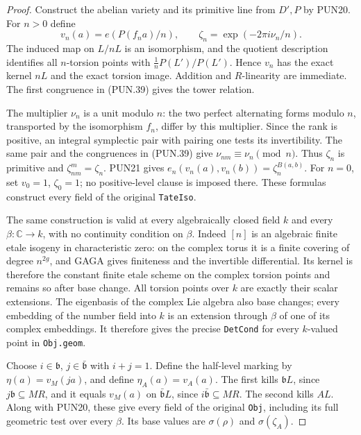 \documentclass[11pt,a4paper]{article}
\numberwithin{equation}{section}
\theoremstyle{remark}\newtheorem{remark}[theorem]{Remark}
\begin{document}
\begin{proof}
Construct the abelian variety and its primitive line from
\(D',P\) by PUN20.  For \(n>0\) define
\[
 v_n(a)=e(P(f_na)/n),\qquad
                         \zeta_n=\exp(-2\pi i\nu_n/n).
 \tag{PUN.40}
\]
The induced map on \(L/nL\) is an isomorphism, and the
quotient description identifies all \(n\)-torsion points with
\(\tfrac1nP(L')/P(L')\).  Hence \(v_n\) has the exact
kernel \(nL\) and the exact torsion image.  Addition and
\(R\)-linearity are immediate.  The first congruence in
(PUN.39) gives the tower relation.

The multiplier \(\nu_n\) is a unit modulo \(n\): the two
perfect alternating forms modulo \(n\), transported by the
isomorphism \(f_n\), differ by this multiplier.  Since the
rank is positive, an integral symplectic pair with pairing one
tests its invertibility.  The same pair and the congruences
in (PUN.39) give \(\nu_{nm}\equiv\nu_n\pmod n\).
Thus \(\zeta_n\) is primitive and
\(\zeta_{nm}^m=\zeta_n\).  PUN21 gives
\(e_n(v_n(a),v_n(b))=\zeta_n^{B(a,b)}\).
For \(n=0\), set \(v_0=1\), \(\zeta_0=1\); no positive-level
clause is imposed there.  These formulas construct every
field of the original \texttt{Tate\allowbreak Iso}.

The same construction is valid at every algebraically closed
field \(k\) and every \(\beta:\mathbb C\to k\), with no
continuity condition on \(\beta\).  Indeed \([n]\) is an
algebraic finite etale isogeny in characteristic zero: on the
complex torus it is a finite covering of degree \(n^{2g}\),
and GAGA gives finiteness and the invertible differential.
Its kernel is therefore the constant finite etale scheme on
the complex torsion points and remains so after base change.
All torsion points over \(k\) are exactly their scalar
extensions.  The eigenbasis of the complex Lie algebra also
base changes; every embedding of the number field into \(k\)
is an extension through \(\beta\) of one of its complex
embeddings.  It therefore gives the precise \texttt{Det\allowbreak Cond}
for every \(k\)-valued point in \texttt{Obj.\allowbreak geom}.

Choose \(i\in\mathfrak b\), \(j\in\bar{\mathfrak b}\)
with \(i+j=1\).  Define the half-level marking by
\(\eta(a)=v_M(ja)\), and define \(\eta_A(a)=v_A(a)\).
The first kills \(\mathfrak bL\), since
\(j\mathfrak b\subseteq MR\), and it equals \(v_M(a)\)
on \(\bar{\mathfrak b}L\), since
\(i\bar{\mathfrak b}\subseteq MR\).  The second kills
\(AL\).  Along with PUN20, these give every field of the
original \texttt{Obj}, including its full geometric test
over every \(\beta\).  Its base values are
\(\sigma(\rho)\) and \(\sigma(\zeta_A)\).


\end{proof}
\end{document}
